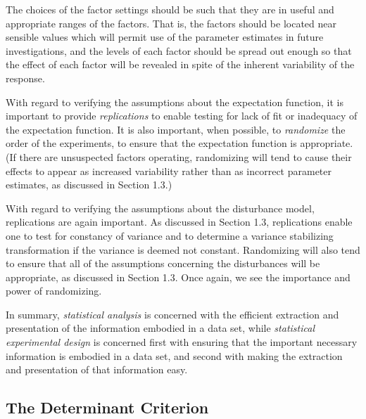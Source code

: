 The choices of the factor settings should be such that they are in
useful and appropriate ranges of the factors.
That is, the factors should be located near sensible
values which will permit use of the parameter estimates in future
investigations, and the levels of each factor should be spread
out enough so that the effect of each factor will be revealed in
spite of the inherent variability of the response.

With regard to
verifying the assumptions about the expectation
function, it is important to provide {\em replications\/}
to enable testing for lack of fit or inadequacy of the
expectation function.
It is also important, when possible, to {\em randomize\/}
the order of the
experiments, to ensure that the expectation function is appropriate.
(If there are unsuspected factors operating, randomizing will tend
to cause their effects to appear as increased variability rather
than as incorrect parameter estimates, as discussed in Section 1.3.)

With regard to
verifying the assumptions about the disturbance
model, replications are again important.
As discussed in Section 1.3, replications enable one to test for
constancy of variance and to determine a variance stabilizing
transformation if the variance is deemed not constant.
Randomizing will also tend to ensure that all of the
assumptions concerning the disturbances will be appropriate, as
discussed in Section 1.3.
Once again, we see the importance and power of randomizing.

In summary, {\em statistical analysis\/} is concerned with the efficient
extraction and presentation of the information embodied in a data set,
while {\em statistical experimental design\/}
is concerned first with
ensuring that the important necessary information is embodied in a data
set,
and second with making the extraction and presentation of that
information easy.

\subsection{The Determinant Criterion}

